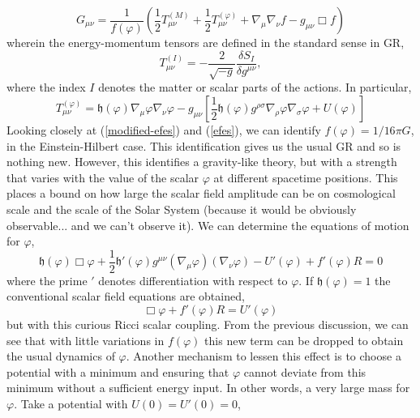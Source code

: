 \begin{equation}\label{modified-efes}
    G_{\mu\nu} = \frac{1}{f(\varphi)}\left(\frac{1}{2}T_{\mu\nu}^{(M)} + \frac{1}{2}T_{\mu\nu}^{(\varphi)} + \nabla_{\mu}\nabla_{\nu}f - g_{\mu\nu}\Box f\right)
\end{equation}
wherein the energy-momentum tensors are defined in the standard sense in GR,
\begin{equation}
T^{(I)}_{\mu\nu} = -\frac{2}{\sqrt{-g}}\frac{\delta S_{I}}{\delta g^{\mu\nu}},
\end{equation}
where the index $I$ denotes the matter or scalar parts of the actions. In particular, 
\begin{equation}
    T_{\mu\nu}^{(\varphi)} = \mathfrak{h}(\varphi)\nabla_{\mu}\varphi\nabla_{\nu}\varphi - g_{\mu\nu}\left[\frac{1}{2}\mathfrak{h}(\varphi)g^{\rho\sigma}\nabla_{\rho}\varphi\nabla_{\sigma}\varphi + U(\varphi)\right]
\end{equation}
Looking closely at (\ref{modified-efes}) and (\ref{efes}), we can identify $f(\varphi) = 1/16\pi G$, in the Einstein-Hilbert case. This identification gives us the usual GR and so is nothing new. However, this identifies a gravity-like theory, but with a strength that varies with the value of the scalar $\varphi$ at different spacetime positions. This places a bound on how large the scalar field amplitude can be on cosmological scale and the scale of the Solar System (because it would be obviously observable... and we can't observe it). We can determine the equations of motion for $\varphi$, 
\begin{equation}
    \mathfrak{h}(\varphi)\Box\varphi + \frac{1}{2}\mathfrak{h}'(\varphi)g^{\mu\nu}(\nabla_{\mu}\varphi)(\nabla_{\nu}\varphi) - U'(\varphi) + f'(\varphi)R = 0
\end{equation}
where the prime $'$ denotes differentiation with respect to $\varphi$. If $\mathfrak{h}(\varphi) = 1$ the conventional scalar field equations are obtained, 
\begin{equation}
    \Box\varphi + f'(\varphi)R= U'(\varphi)
\end{equation}
but with this curious Ricci scalar coupling. From the previous discussion, we can see that with little variations in $f(\varphi)$ this new term can be dropped to obtain the usual dynamics of $\varphi$. Another mechanism to lessen this effect is to choose a potential with a minimum and ensuring that $\varphi$ cannot deviate from this minimum without a sufficient energy input. In other words, a very large mass for $\varphi$. Take a potential with $U(0) = U'(0) = 0$, 

